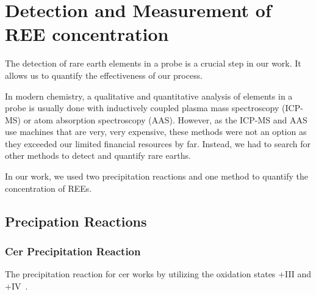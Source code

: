 \chapter{Detection and Measurement of REE concentration\authorA{}}


The detection of rare earth elements in a probe is a crucial step in our work.
It allows us to quantify the effectiveness of our process.

In modern chemistry,
a qualitative and quantitative analysis of elements in a probe is usually done with inductively coupled plasma mass spectroscopy (ICP-MS) or atom absorption spectroscopy (AAS).
However, as the ICP-MS and AAS use machines that are very, very expensive,
these methods were not an option as they exceeded our limited financial resources by far.
Instead, we had to search for other methods to detect and quantify rare earths.

In our work, we used two precipitation reactions and one method to quantify the concentration of REEs.


\section{Precipation Reactions}

\subsection{Cer Precipitation Reaction}
The precipitation reaction for cer works by utilizing the oxidation states +III and +IV~\cite{cerdetection,janderblasius}.

